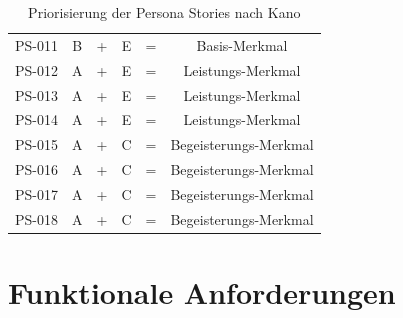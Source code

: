 \begin{description}
\begin{table}[h!]
\begin{tabular}{cccccc}
PS-011        & B                                                             & + & E                                                                & = & Basis-Merkmal         \\
PS-012        & A                                                             & + & E                                                                & = & Leistungs-Merkmal     \\
PS-013        & A                                                             & + & E                                                                & = & Leistungs-Merkmal     \\
PS-014        & A                                                             & + & E                                                                & = & Leistungs-Merkmal     \\
PS-015        & A                                                             & + & C                                                                & = & Begeisterungs-Merkmal \\
PS-016        & A                                                             & + & C                                                                & = & Begeisterungs-Merkmal \\
PS-017        & A                                                             & + & C                                                                & = & Begeisterungs-Merkmal \\
PS-018        & A                                                             & + & C                                                                & = & Begeisterungs-Merkmal
\end{tabular}
\caption{Priorisierung der Persona Stories nach Kano}
\end{table}

\newpage{}
\section{Funktionale Anforderungen}
\label{sec:funktionaleanforderungen}

\begin{usecase}
\end{usecase}


\end{description}

